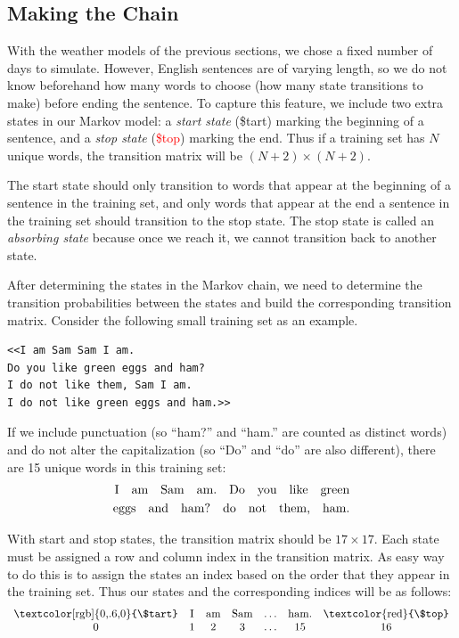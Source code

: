 \subsection*{Making the Chain} %

With the weather models of the previous sections, we chose a fixed number of days to simulate.
However, English sentences are of varying length, so we do not know beforehand how many words to choose (how many state transitions to make) before ending the sentence.
To capture this feature, we include two extra states in our Markov model: a \emph{start state} (\textcolor[rgb]{0,.6,0}{\$tart}) marking the beginning of a sentence, and a \emph{stop state} (\textcolor{red}{\$top}) marking the end.
Thus if a training set has $N$ unique words, the transition matrix will be $(N+2) \times (N+2)$.

The start state should only transition to words that appear at the beginning of a sentence in the training set, and only words that appear at the end a sentence in the training set should transition to the stop state.
The stop state is called an \emph{absorbing state} because once we reach it, we cannot transition back to another state.

After determining the states in the Markov chain, we need to determine the transition probabilities between the states and build the corresponding transition matrix.
Consider the following small training set as an example.

\begin{lstlisting}
<<I am Sam Sam I am.
Do you like green eggs and ham?
I do not like them, Sam I am.
I do not like green eggs and ham.>>
\end{lstlisting}

If we include punctuation (so ``ham?'' and ``ham.'' are counted as distinct words) and do not alter the capitalization (so ``Do'' and ``do'' are also different), there are 15 unique words in this training set:
%
\begin{align*}
\text{I\quad am\quad Sam\quad am.\quad Do\quad you\quad like\quad green}
\\
\text{eggs\quad and\quad ham?\quad do\quad not\quad them,\quad ham.}
\end{align*}

With start and stop states, the transition matrix should be $17 \times 17$.
Each state must be assigned a row and column index in the transition matrix.
As easy way to do this is to assign the states an index based on the order that they appear in the training set.
Thus our states and the corresponding indices will be as follows:
%
\begin{align*}
\begin{array}{ccccccc}
\text{\textcolor[rgb]{0,.6,0}{\$tart}} & \text{I} & \text{am} & \text{Sam} & \ldots & \text{ham.} & \text{\textcolor{red}{\$top}}
\\
0 & 1 & 2 & 3 & \ldots & 15 & 16
\end{array}
\end{align*}

